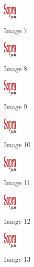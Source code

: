 \begin{figure}[!h]
  \center
  \includegraphics[width=1cm]{img/test.jpg}
  \caption{Image 7}
\end{figure}

\begin{figure}[!h]
  \center
  \includegraphics[width=1cm]{img/test.jpg}
  \caption{Image 8}
\end{figure}

\begin{figure}[!h]
  \center
  \includegraphics[width=1cm]{img/test.jpg}
  \caption{Image 9}
\end{figure}

\begin{figure}[!h]
  \center
  \includegraphics[width=1cm]{img/test.jpg}
  \caption{Image 10}
\end{figure}

\begin{figure}[!h]
  \center
  \includegraphics[width=1cm]{img/test.jpg}
  \caption{Image 11}
\end{figure}

\begin{figure}[!h]
  \center
  \includegraphics[width=1cm]{img/test.jpg}
  \caption{Image 12}
\end{figure}

\begin{figure}[!h]
  \center
  \includegraphics[width=1cm]{img/test.jpg}
  \caption{Image 13}
\end{figure}

